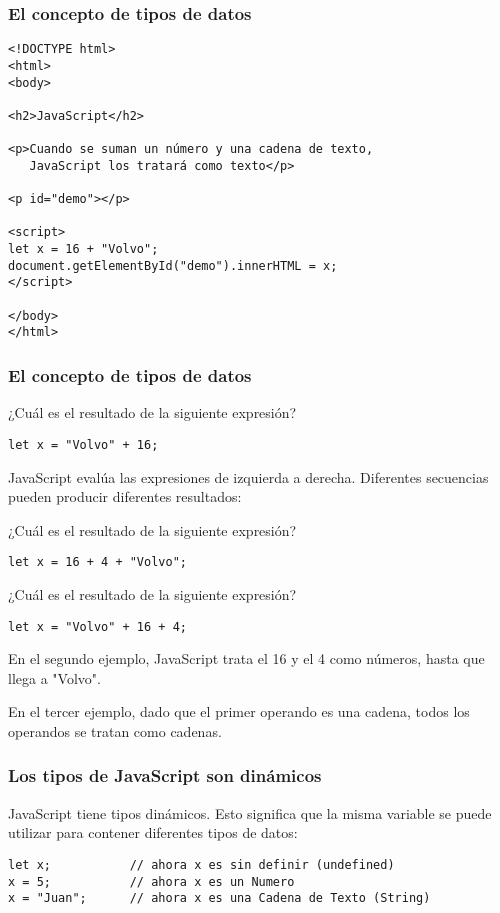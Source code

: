 \begin{frame}[fragile]
  \frametitle{El concepto de tipos de datos}
  \begin{lstlisting}
<!DOCTYPE html>
<html>
<body>

<h2>JavaScript</h2>

<p>Cuando se suman un número y una cadena de texto,
   JavaScript los tratará como texto</p>

<p id="demo"></p>

<script>
let x = 16 + "Volvo";
document.getElementById("demo").innerHTML = x;
</script>

</body>
</html>
  \end{lstlisting}
\end{frame}

\begin{frame}[fragile]
  \frametitle{El concepto de tipos de datos}

  ¿Cuál es el resultado de la siguiente expresión?

  \begin{lstlisting}
let x = "Volvo" + 16;
  \end{lstlisting}

  JavaScript evalúa las expresiones de izquierda a derecha.
  Diferentes secuencias pueden producir diferentes resultados:

  \vspace{\baselineskip}
¿Cuál es el resultado de la siguiente expresión?
  \begin{lstlisting}
let x = 16 + 4 + "Volvo";
  \end{lstlisting}

  \vspace{\baselineskip}
¿Cuál es el resultado de la siguiente expresión?
  \begin{lstlisting}
let x = "Volvo" + 16 + 4;
  \end{lstlisting}

  En el segundo ejemplo, JavaScript trata el 16 y el 4 como números,
  hasta que llega a "Volvo".

  \vspace{\baselineskip}
  En el tercer ejemplo, dado que el primer operando es una cadena,
  todos los operandos se tratan como cadenas.
\end{frame}

\begin{frame}[fragile]
  \frametitle{Los tipos de JavaScript son dinámicos}

  JavaScript tiene tipos dinámicos. Esto significa que la misma
  variable se puede utilizar para contener diferentes tipos de datos:

  \vspace{\baselineskip}
  \begin{lstlisting}
let x;           // ahora x es sin definir (undefined)
x = 5;           // ahora x es un Numero
x = "Juan";      // ahora x es una Cadena de Texto (String)
  \end{lstlisting}
\end{frame}

